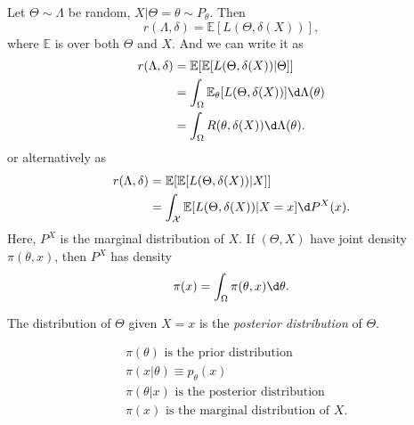 \documentclass[a4paper]{article}
\begin{document}
\begin{remark}
	Let $\Theta \sim \Lambda$ be random, $X|\Theta=\theta \sim P_\theta$. Then
	\begin{equation}
		r(\Lambda,\delta)=\mathbb{E}[L(\Theta,\delta(X))],
	\end{equation}
	where $\mathbb{E}$ is over both $\Theta$ and $X$. And we can write it as
	\begin{equation}
		\begin{aligned}
			r(\Lambda,\delta) &= \mathbb{E}[\mathbb{E}[L(\Theta,\delta(X))|\Theta]] \\
							  &= \int_{\Omega}\mathbb{E}_\theta[L(\Theta,\delta(X))] \d \Lambda(\theta) \\
							  &= \int_{\Omega}R(\theta,\delta(X)) \d \Lambda(\theta).
		\end{aligned}
	\end{equation}
	or alternatively as 
	\begin{equation}
		\begin{aligned}
			r(\Lambda,\delta) &= \mathbb{E}[\mathbb{E}[L(\Theta,\delta(X))|X]] \\
							  &= \int_{\mathcal{X}}\mathbb{E}[L(\Theta,\delta(X))|X=x] \d P^{X}(x). \\
		\end{aligned}
	\end{equation}
	Here, $P^{X}$ is the marginal distribution of $X$. If $(\Theta,X)$ have joint density $\pi (\theta,x)$, then $P^{X}$ has density
	\begin{equation}
		\pi (x) = \int_{\Omega}\pi (\theta,x) \d \theta.
	\end{equation}
\end{remark}

\begin{defi}
	The distribution of $\Theta$ given $X=x$ is the \emph{posterior distribution} of $\Theta$.
\end{defi}

\begin{notation}
	\begin{equation*}
		\begin{aligned}
			&\pi (\theta) \text{ is the prior distribution} \\
			&\pi(x|\theta) \equiv p_\theta(x) \\
			&\pi(\theta|x) \text{ is the posterior distribution} \\
			&\pi (x) \text{ is the marginal distribution of } X.
		\end{aligned}
	\end{equation*}
\end{notation}
\end{document}
